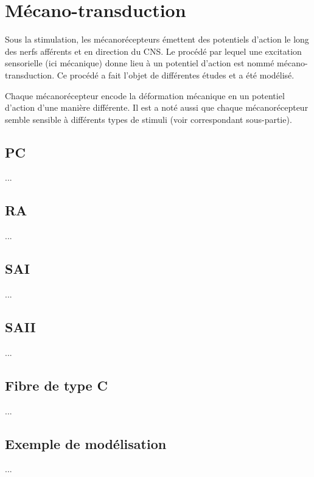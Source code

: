 \section{Mécano-transduction}
Sous la stimulation, les mécanorécepteurs émettent des potentiels d’action le long des nerfs afférents et en direction du CNS. Le procédé par lequel une excitation sensorielle (ici mécanique) donne lieu à un potentiel d’action est nommé mécano-transduction. Ce procédé a fait l’objet de différentes études et a été modélisé.\par
Chaque mécanorécepteur encode la déformation mécanique en un potentiel d’action d’une manière différente. Il est a noté aussi que chaque mécanorécepteur semble sensible à différents types de stimuli (voir correspondant sous-partie).\par

\subsection{PC}
...

\subsection{RA}
...

\subsection{SAI}
...

\subsection{SAII}
...

\subsection{Fibre de type C}
...

\subsection{Exemple de modélisation}
...


